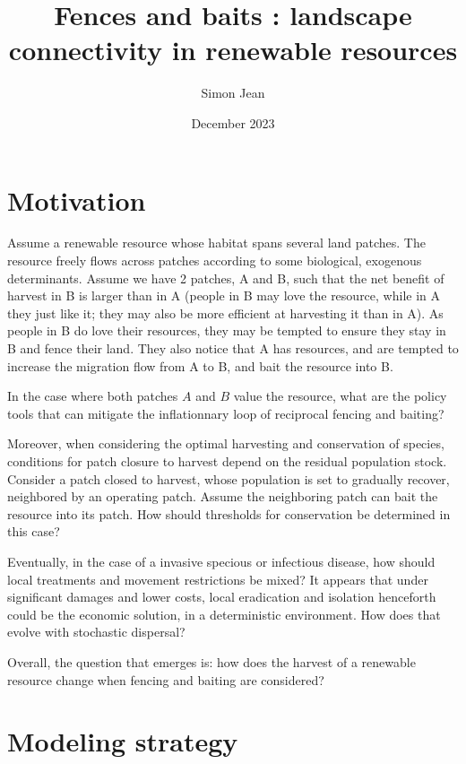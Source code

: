 \documentclass{article}
\title{Fences and baits : landscape connectivity in renewable resources}
\author{Simon Jean}
\date{December 2023}
\begin{document}
\maketitle

\section{Motivation}
Assume a renewable resource whose habitat spans several land patches. The resource freely flows across patches according to some biological, exogenous determinants.  Assume we have 2 patches, A and B, such that the net benefit of harvest in B is larger than in A (people in B may love the resource, while in A they just like it; they may also be more efficient at harvesting it than in A). As people in B do love their resources, they may be tempted to ensure they stay in B and fence their land. They also notice that A has resources, and are tempted to increase the migration flow from A to B, and bait the resource into B. 

In the case where both patches $A$ and $B$ value the resource, what are the policy tools that can mitigate the inflationnary loop of reciprocal fencing and baiting?

Moreover, when considering the optimal harvesting and conservation of species, conditions for patch closure to harvest depend on the residual population stock. Consider a patch closed to harvest, whose population is set to gradually recover, neighbored by an operating patch. Assume the neighboring patch can bait the resource into its patch. How should thresholds for conservation be determined in this case? 

Eventually, in the case of a invasive specious or infectious disease, how should local treatments and movement restrictions be mixed? It appears that under significant damages and lower costs, local eradication and isolation henceforth could be the economic solution, in a deterministic environment. How does that evolve with stochastic dispersal?

Overall, the question that emerges is: how does the harvest of a renewable resource change when fencing and baiting are considered?

\section{Modeling strategy}
\end{document}
